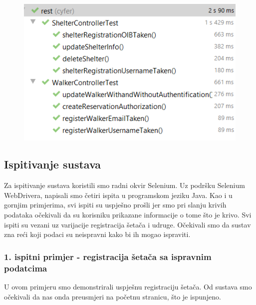 			\begin{figure}[H]
				\includegraphics[scale=0.75]{slike/UnitRezultati.PNG}
				\centering
			\end{figure}
			
			
			
			
			\subsection{Ispitivanje sustava}
			
				Za ispitivanje sustava koristili smo radni okvir Selenium. Uz podršku Selenium WebDrivera, napisali smo četiri ispita u programskom jeziku Java. Kao i u gornjim primjerima, svi ispiti su uspješno prošli jer smo pri slanju krivih podataka očekivali da su korisniku prikazane informacije o tome što je krivo. Svi ispiti su vezani uz varijacije registracija šetača i udruge. Očekivali smo da sustav zna reći koji podaci su neispravni kako bi ih mogao ispraviti.
			
			\subsubsection{1. ispitni primjer - registracija šetača sa ispravnim podatcima}
			
				U ovom primjeru smo demonstrirali uspješnu registraciju šetača. Od sustava smo očekivali da nas onda preusmjeri na početnu stranicu, što je ispunjeno.
				
